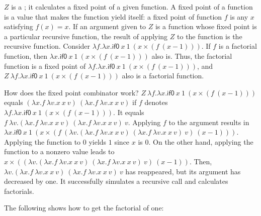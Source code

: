 \(Z\) is a ; it calculates a fixed point of a given
function. A fixed point of a function is a value that makes the function yield
itself: a fixed point of function \(f\) is any \(x\) satisfying \(f(x)=x\). If an
argument given to \(Z\) is a function whose fixed point is a particular recursive
function, the result of applying \(Z\) to the function is the recursive function.
Consider \(\lambda f.\lambda x.\textsf{if0}\ x\ 1\ (x\times(f\ (x-1)))\). If
\(f\) is a factorial function, then \(\lambda x.\textsf{if0}\ x\ 1\ (x\times(f\
(x-1)))\) also is. Thus, the factorial function is a fixed point of \(\lambda
f.\lambda x.\textsf{if0}\ x\ 1\ (x\times(f\ (x-1)))\), and \(Z\ \lambda f.\lambda
x.\textsf{if0}\ x\ 1\ (x\times(f\ (x-1)))\) also is a factorial function.

How does the fixed point combinator work? \(Z\ \lambda f.\lambda x.\textsf{if0}\
x\ 1\ (x\times(f\ (x-1)))\) equals \( (\lambda x.f\ \lambda v.x\ x\ v)\ (\lambda
x.f\ \lambda v.x\ x\ v)\) if \(f\) denotes \(\lambda f.\lambda x.\textsf{if0}\ x\
1\ (x\times(f\ (x-1)))\). It equals \(f\ \lambda v.(\lambda x.f\ \lambda v.x\ x\
v)\ (\lambda x.f\ \lambda v.x\ x\ v)\ v\). Applying \(f\) to the argument results
in \(\lambda x.\textsf{if0}\ x\ 1\ (x\times(f\ (\lambda v.(\lambda x.f\ \lambda
v.x\ x\ v)\ (\lambda x.f\ \lambda v.x\ x\ v)\ v)\ (x-1)))\). Applying the
function to \(0\) yields \(1\) since \(x\) is \(0\). On the other hand, applying
the function to a nonzero value leads to \(x\times((\lambda v.(\lambda x.f\
\lambda v.x\ x\ v)\ (\lambda x.f\ \lambda v.x\ x\ v)\ v)\ (x-1))\). Then,
\(\lambda v.(\lambda x.f\ \lambda v.x\ x\ v)\ (\lambda x.f\ \lambda v.x\ x\ v)\
v\) has reappeared, but its argument has decreased by one. It successfully
simulates a recursive call and calculates factorials.

The following shows how to get the factorial of one:

